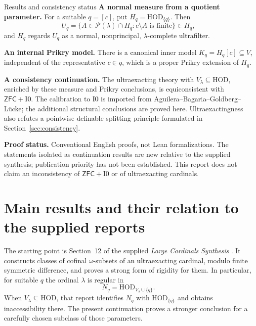 \documentclass[11pt,letterpaper]{article}
\theoremstyle{definition}
\numberwithin{equation}{section}
\newcommand{\ZFC}{\mathsf{ZFC}}
\newcommand{\HOD}{\mathrm{HOD}}
\newcommand{\Pow}{\mathcal P}
\newcommand{\Izero}{\mathrm{I0}}
\begin{document}
\begin{assessment}{Results and consistency status}
\textbf{A normal measure from a quotient parameter.}
For a suitable $q=[c]$, put $H_q=\HOD_{\{q\}}$. Then
\[
 U_q=\{A\in\Pow(\lambda)\cap H_q:c\setminus A\text{ is finite}\}\in H_q,
\]
and $H_q$ regards $U_q$ as a normal, nonprincipal, $\lambda$-complete ultrafilter.

\textbf{An internal Prikry model.}
There is a canonical inner model $K_q=H_q[c]\subseteq V$, independent of the representative $c\in q$, which is a proper Prikry extension of $H_q$.

\textbf{A consistency continuation.}
The ultraexacting theory with $V_\lambda\subseteq\HOD$, enriched by these measure and Prikry conclusions, is equiconsistent with $\ZFC+\Izero$. The calibration to $\Izero$ is imported from Aguilera--Bagaria--Goldberg--L\"ucke; the additional structural conclusions are proved here. Ultraexactingness also refutes a pointwise definable splitting principle formulated in Section~\ref{sec:consistency}.
\end{assessment}

{\small\color{Muted}\textbf{Proof status.} Conventional English proofs, not Lean formalizations. The statements isolated as continuation results are new relative to the supplied synthesis; publication priority has not been established. This report does not claim an inconsistency of $\ZFC+\Izero$ or of ultraexacting cardinals.}

\newpage
\tableofcontents

\newpage
\section{Main results and their relation to the supplied reports}\label{sec:main}

The starting point is Section~12 of the supplied \emph{Large Cardinals Synthesis} \cite{synthesis}. It constructs classes of cofinal $\omega$-subsets of an ultraexacting cardinal, modulo finite symmetric difference, and proves a strong form of rigidity for them. In particular, for suitable $q$ the ordinal $\lambda$ is regular in
\[
 N_q=\HOD_{V_\lambda\cup\{q\}}.
\]
When $V_\lambda\subseteq\HOD$, that report identifies $N_q$ with $\HOD_{\{q\}}$ and obtains inaccessibility there. The present continuation proves a stronger conclusion for a carefully chosen subclass of those parameters.
\end{document}
